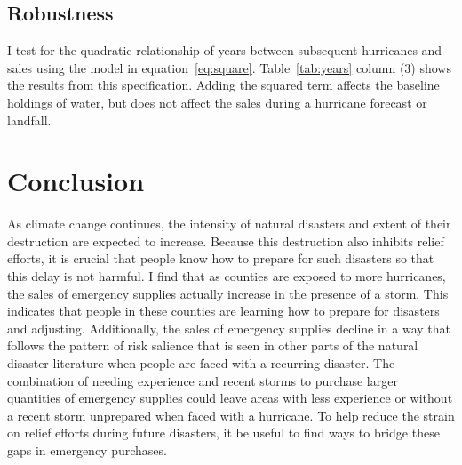 \documentclass{article}
\begin{document}

\subsection{Robustness}

I test for the quadratic relationship of years between subsequent hurricanes and sales using the model in equation~\ref{eq:square}. Table~\ref{tab:years} column (3) shows the results from this specification. Adding the squared term affects the baseline holdings of water, but does not affect the sales during a hurricane forecast or landfall.



\section{Conclusion}

As climate change continues, the intensity of natural disasters and extent of their destruction are expected to increase. Because this destruction also inhibits relief efforts, it is crucial that people know how to prepare for such disasters so that this delay is not harmful. I find that as counties are exposed to more hurricanes, the sales of emergency supplies actually increase in the presence of a storm. This indicates that people in these counties are learning how to prepare for disasters and adjusting. Additionally, the sales of emergency supplies decline in a way that follows the pattern of risk salience that is seen in other parts of the natural disaster literature when people are faced with a recurring disaster. The combination of needing experience and recent storms to purchase larger quantities of emergency supplies could leave areas with less experience or without a recent storm unprepared when faced with a hurricane. To help reduce the strain on relief efforts during future disasters, it be useful to find ways to bridge these gaps in emergency purchases.
\end{document}
